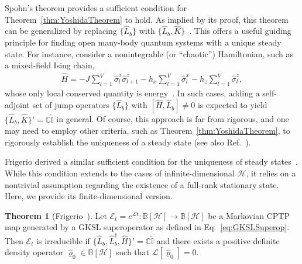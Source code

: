 \documentclass[preprint,pteplogo]{ptephy_v2}%
\numberwithin{equation}{section}
\theoremstyle{definition}
\newtheorem{theorem}{Theorem}
\newcommand{\mc}[1]{\mathcal{#1}}
\newcommand{\mbb}[1]{\mathbb{#1}}
\begin{document}
Spohn's theorem provides a sufficient condition for Theorem~\ref{thm:YoshidaTheorem} to hold.
As implied by its proof, this theorem can be generalized by replacing $\{ \hat{L}_b \}$ with $\{ \hat{L}_b, \hat{K} \}$~\cite{zhang2024criteria}.
This offers a useful guiding principle for finding open many-body quantum systems with a unique steady state. 
For instance, consider a nonintegrable (or ``chaotic'') Hamiltonian, such as a mixed-field Ising chain, 
\begin{align}
\hat{H} = -J \sum_{l=1}^V \hat{\sigma}^z_l \hat{\sigma}^z_{l+1} - h_x \sum_{l=1}^V \hat{\sigma}^x_l -h_z \sum_{l=1}^V \hat{\sigma}^z_l,
\end{align}
whose only local conserved quantity is energy~\cite{banuls2011strong, chiba2024proof}.
In such cases, adding a self-adjoint set of jump operators $\{ \hat{L}_b \}$ with $[\hat{H},\hat{L}_b]\neq0$ is expected to yield $\{ \hat{L}_b, \hat{K} \}' = \mbb{C} \hat{\mbb{I}}$ in general.
Of course, this approach is far from rigorous, and one may need to employ other criteria, such as Theorem~\ref{thm:YoshidaTheorem}, to rigorously establish the uniqueness of a steady state (see also Ref.~\cite{seltmann2025uniqueness}).

Frigerio derived a similar sufficient condition for the uniqueness of steady states~\cite{frigerio1977quantum}.
While this condition extends to the cases of infinite-dimensional $\mc{H}$, it relies on a nontrivial assumption regarding the existence of a full-rank stationary state.
Here, we provide its finite-dimensional version.

\begin{theorem}[Frigerio~\cite{frigerio1977quantum}]
\label{thm:FrigerioTheorem}
Let $\mc{E}_t = e^{\mc{L}t}: \mbb{B}[\mc{H}] \to \mbb{B}[\mc{H}]$ be a Markovian CPTP map generated by a GKSL superoperator as defined in Eq.~\eqref{eq:GKSLSuperop}. 
Then $\mc{E}_t$ is irreducible if $\{ \hat{L}_b, \hat{L}_b^\dagger, \hat{H} \}' = \mbb{C} \hat{\mbb{I}}$ and there exists a positive definite density operator $\hat{\varrho}_0 \in \mbb{B}[\mc{H}]$ such that $\mc{L}[\hat{\varrho}_0]=0$.
\end{theorem}
\end{document}
